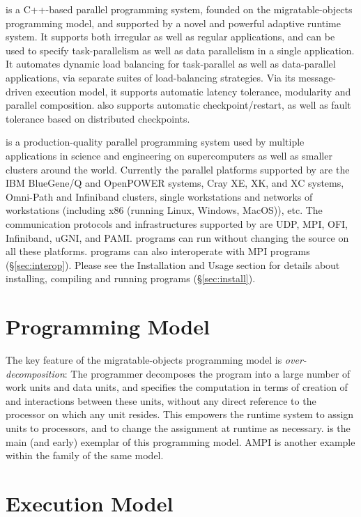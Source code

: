 
\charm is a C++-based parallel programming system, founded on the
migratable-objects programming model, and supported by a novel and
powerful adaptive runtime system. It supports both irregular as well
as regular applications, and can be used to specify task-parallelism
as well as data parallelism in a single application. It automates
dynamic load balancing for task-parallel as well as data-parallel
applications, via separate suites of load-balancing strategies. Via
its message-driven execution model, it supports automatic latency
tolerance, modularity and parallel composition. \charm also supports
automatic checkpoint/restart, as well as fault tolerance based on
distributed checkpoints.

\charm is a production-quality parallel programming system used by
multiple applications in science and engineering on supercomputers as
well as smaller clusters around the world.  Currently the parallel
platforms supported by \charm are the IBM BlueGene/Q and OpenPOWER systems,
Cray XE, XK, and XC systems, Omni-Path and Infiniband clusters, single workstations and
networks of workstations (including x86 (running Linux, Windows, MacOS)), etc.
The communication protocols and infrastructures supported by
\charm are UDP, MPI, OFI, Infiniband, uGNI, and PAMI.
\charm programs can run without changing the source
on all these platforms. \charm programs can
also interoperate with MPI programs (\S\ref{sec:interop}).
Please see the Installation and Usage section
for details about installing, compiling and running
\charm programs (\S\ref{sec:install}).


\section{Programming Model}
The key feature of the migratable-objects programming model is {\em
over-decomposition}: The programmer decomposes the program into a
large number of work units and data units, and specifies the
computation in terms of creation of and interactions between these
units, without any direct reference to the processor on which any unit
resides. This empowers the runtime system to assign units to
processors, and to change the assignment at runtime as
necessary. \charm is the main (and early) exemplar of this
programming model. AMPI is another example within the \charm family
of the same model.


\section{Execution Model}

